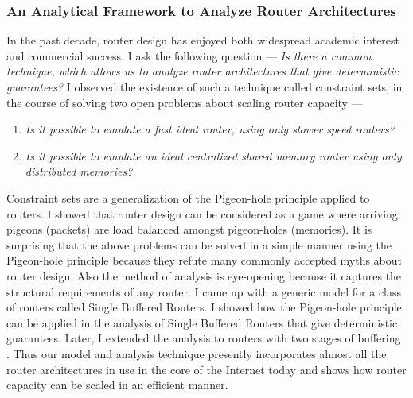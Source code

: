 \documentclass[10pt]{article}
\begin{document}
\begin{small}

\subsubsection*{\small An Analytical Framework to Analyze Router Architectures}

In the past decade, router design has enjoyed both widespread academic interest and
commercial success. I ask the following question --- {\em Is there a common
technique, which allows us to analyze router architectures that give deterministic 
guarantees?}
I observed the existence of such a technique called constraint sets, in the course of solving 
two open problems about scaling router capacity ---

\begin{enumerate}

\item {\em Is it possible to emulate a fast ideal router, using only slower speed routers?}

\item {\em Is it possible to emulate an ideal centralized shared memory router using only distributed memories?}

\end{enumerate}

Constraint sets are a generalization of the Pigeon-hole principle applied to
routers. I showed that router design can be considered as a game where arriving
pigeons (packets) are load balanced amongst pigeon-holes (memories). 
It is surprising that the above problems can be solved \cite{pps, ppsmcast, dsm} in a simple
manner using the Pigeon-hole principle because they refute many commonly 
accepted myths about router design. 
Also the method of analysis is eye-opening because it captures the structural 
requirements of any router. 
I came up with a generic model for a class of routers called Single Buffered Routers. 
I showed how the Pigeon-hole principle can be applied in the analysis of Single Buffered
Routers that give deterministic guarantees.  Later, I extended the analysis to 
routers with two stages of buffering \cite{csets}. 
Thus our model and analysis technique
presently incorporates almost all the router architectures in use in the
core of the Internet today and shows how router capacity can be scaled in
an efficient manner.



\end{small}
\end{document}
